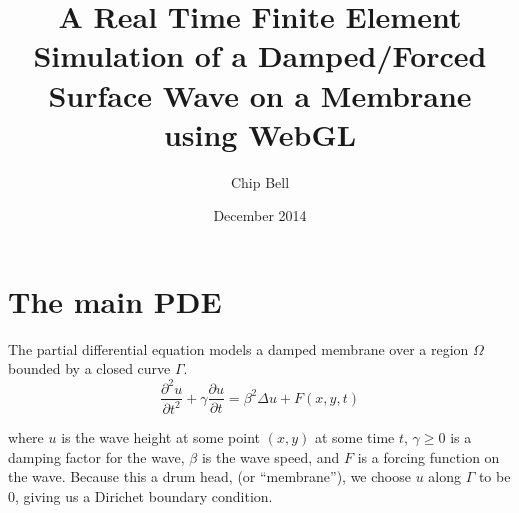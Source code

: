 \documentclass[a4paper,12pt]{article}
\begin{document}
\newcommand{\innerproduct}[2]{\int\limits_{\Omega} #1 #2 d\Omega}
\newcommand{\innerproductdot}[2]{\int\limits_{\Omega} \nabla #1 \cdot \nabla #2 d\Omega}
\newcommand{\firstderivative}[2]{\frac{d #1}{d #2}}
\newcommand{\secondderivative}[2]{\frac{d^2 #1}{d #2^2}}
\newcommand{\firstpartial}[2]{\frac{\partial #1}{\partial #2}}
\newcommand{\secondpartial}[2]{\frac{\partial^2 #1}{\partial #2^2}}
\newcommand{\laplacian}[1]{\Delta #1}
\newcommand{\secondfinitediff}[1]{\frac{#1^{n+1} - 2#1^n + #1^{n-1}}{\delta t^2}}
\newcommand{\firstfinitediff}[1]{\frac{#1^{n+1} - #1^{n-1}}{2\delta t}}
\newcommand{\step}[1]{\left( \frac{1}{\delta t^2} #1 \frac{\gamma}{2\delta t} \right)}
\newcommand{\mat}[2][rrrrrr]{
    \left(\begin{array}{#1}
    #2 \\
    \end{array}
    \right)
}

\title{A Real Time Finite Element Simulation of a Damped/Forced Surface Wave on a Membrane using WebGL}
\author{Chip Bell}
\date{December 2014}
\maketitle



\section{The main PDE}
The partial differential equation models a damped membrane over a region $\Omega$ bounded by a closed curve $\Gamma$.
\begin{equation} \label{eq:main_pde}
\secondpartial{u}{t} + \gamma \firstpartial{u}{t}
=
\beta^2 \laplacian{u} + F(x,y,t)
\end{equation}

where $u$ is the wave height at some point $(x,y)$ at some time $t$, $\gamma \ge 0$ is a damping factor for the wave,
$\beta$ is the wave speed, and $F$ is a forcing function on the wave. Because this a drum head, (or ``membrane''), we choose
$u$ along $\Gamma$ to be 0, giving us a Dirichet boundary condition.





\end{document}
